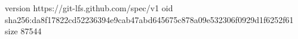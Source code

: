 version https://git-lfs.github.com/spec/v1
oid sha256:da8f17822cd52236394e9cab47abd645675c878a09e532306f0929d1f6252f61
size 87544
